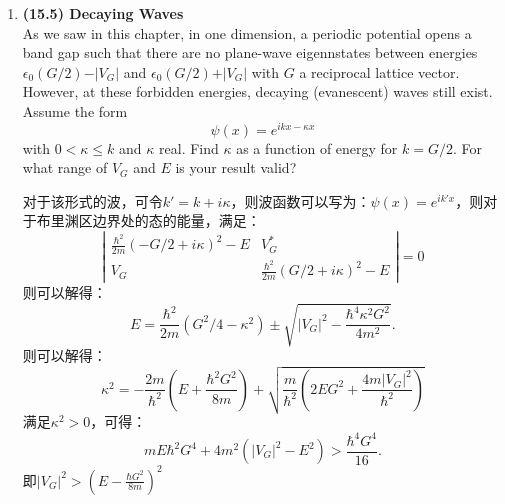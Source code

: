 \documentclass[reqno,a4paper,12pt]{amsart}
\begin{document}
\begin{enumerate}[1.]
\item \textbf{(15.5) Decaying Waves} \\
As we saw in this chapter, in one dimension, a periodic potential opens a band gap such that there are no plane-wave eigennstates between energies $\epsilon_0(G/2) - \vert V_G \vert$ and $\epsilon_0(G/2) + \vert V_G \vert$ with $G$ a reciprocal lattice vector. However, at these forbidden energies, decaying (evanescent) waves still exist. Assume the form 
\[
	\psi(x) = e^{ikx - \kappa x}
\]
with $0<\kappa\leq k$ and $\kappa$ real. Find $\kappa$ as a function of energy for $k = G/2$. For what range of $V_G$ and $E$ is your result valid?
\begin{tcolorbox}[breakable, colback = black!5!white, colframe = black]
对于该形式的波，可令$k' = k+i\kappa$，则波函数可以写为：$\psi(x) = e^{ik'x}$，则对于布里渊区边界处的态的能量，满足：
\[
	\left\vert \begin{matrix}
		\frac{\hbar^2}{2m}(-G/2+i\kappa)^2 - E & V_G^* \\
		V_G & \frac{\hbar^2}{2m}(G/2+i\kappa)^2 - E
	\end{matrix}\right\vert = 0
\]
则可以解得：
\[
	E = \frac{\hbar^2}{2m}(G^2/4-\kappa^2) \pm \sqrt{\vert V_G \vert^2-\frac{\hbar^4\kappa^2G^2}{4m^2}}.
\]
则可以解得：
\[
	\kappa^2 = -\frac{2m}{\hbar^2}\left( E + \frac{\hbar^2G^2}{8m} \right) + \sqrt{\frac{m}{\hbar^2}\left( 2EG^2 + \frac{4m\vert V_G \vert^2}{\hbar^2} \right)}
\]
满足$\kappa^2>0$，可得：
\[
	mE\hbar^2G^4+4m^2(\vert V_G \vert^2-E^2) > \frac{\hbar^4G^4}{16}.
\]
即$\vert V_G \vert^2 > \left( E-\frac{\hbar G^2}{8m} \right)^2$
\end{tcolorbox}

\end{enumerate}
\end{document}
